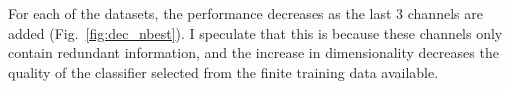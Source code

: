 For each of the datasets, the performance decreases as the last 3 channels are added (Fig.~\ref{fig:dec_nbest}).
I speculate that this is because these channels only contain redundant information, and the increase in dimensionality decreases the quality of the classifier selected from the finite training data available.






